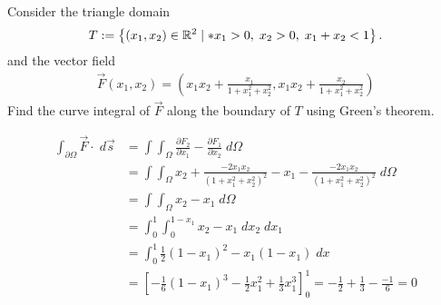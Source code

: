 \documentclass[11pt]{article}
\begin{document}
\begin{exercise}
    Consider the triangle domain 
    \begin{gather*}
        T := \left\{ (x_{1},x_{2}) \in \bbR^{2} \suchthat* x_{1} > 0, \; x_{2} > 0, \; x_{1}+x_{2} < 1 \right\}.
    \end{gather*}
    and the vector field 
    \begin{gather*}
        \vec F(x_{1},x_{2}) = \left( x_{1}x_{2} + \frac{x_{1}}{1+x_{1}^2+x_{2}^2}, x_{1}x_{2} + \frac{x_{2}}{1+x_{1}^2+x_{2}^2} \right)
    \end{gather*}
    Find the curve integral of $\vec F$ along the boundary of $T$ using Green's theorem.
\end{exercise}
\begin{solution}
\begin{align*}
    \int_{\partial \Omega} \vec{F} \cdot \; d \vec{s}
    &= 
    \int\int_{\Omega} \frac{\partial F_{2}}{\partial x_{1}} - \frac{\partial F_{1}}{\partial x_{2}}\; d \Omega
    \\
    &= 
    \int\int_{\Omega} x_{2} + \frac{-2x_{1}x_{2}}{(1+x_{1}^ 2 + x_{2}^ 2)^2} - x_{1} - \frac{-2x_{1}x_{2}}{(1+x_{1}^ 2 + x_{2}^ 2)^2} \; d \Omega
    \\
    &= 
    \int\int_{\Omega} x_{2}  - x_{1}\; d \Omega
    \\
    &= 
    \int_0^ 1\int_0^ {1-x_{1}} x_{2} - x_{1} \;dx_{2}\;dx_{1}
    \\
    &= 
    \int_0^ 1 \frac{1}{2}(1-x_{1})^ 2 - x_{1}(1-x_{1}) \;d x
    \\
    &= 
    \left[ -\frac{1}{6}(1-x_{1})^ 3 - \frac{1}{2} x_{1}^2 + \frac{1}{3}x_{1}^ 3 \right]_0^1 = -\frac{1}{2} + \frac{1}{3} - \frac{-1}{6} = 0
\end{align*}
\end{solution}
\end{document}
